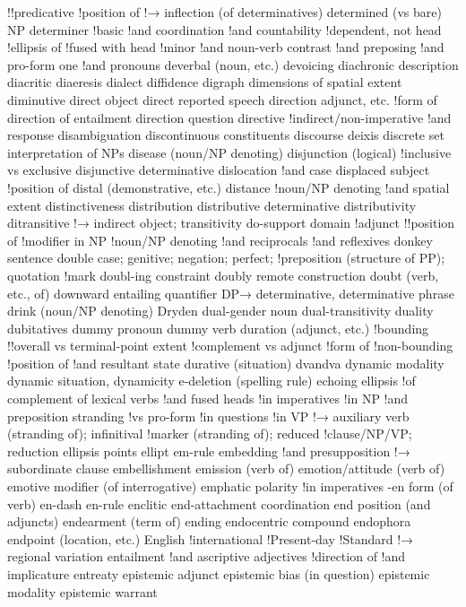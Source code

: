 !!predicative
!position of
!→ inflection (of determinatives)
determined (vs bare) NP
determiner
!basic
!and coordination
!and countability
!dependent, not head
!ellipsis of
!fused with head
!minor
!and noun-verb contrast
!and preposing
!and pro-form one
!and pronouns
deverbal (noun, etc.)
devoicing
diachronic description
diacritic
diaeresis
dialect
diffidence
digraph
dimensions of spatial extent
diminutive
direct object
direct reported speech
direction adjunct, etc.
!form of
direction of entailment
direction question
directive
!indirect/non-imperative
!and response
disambiguation
discontinuous constituents
discourse deixis
discrete set interpretation of NPs
disease (noun/NP denoting)
disjunction (logical)
!inclusive vs exclusive
disjunctive determinative
dislocation
!and case
displaced subject
!position of
distal (demonstrative, etc.)
distance
!noun/NP denoting
!and spatial extent
distinctiveness
distribution
distributive determinative
distributivity
ditransitive
!→ indirect object; transitivity
do-support
domain
!adjunct
!!position of
!modifier in NP
!noun/NP denoting
!and reciprocals
!and reflexives
donkey sentence
double case; genitive; negation; perfect;
!preposition (structure of PP); quotation
!mark
doubl-ing constraint
doubly remote construction
doubt (verb, etc., of)
downward entailing quantifier
DP→ determinative, determinative phrase
drink (noun/NP denoting)
Dryden
dual-gender noun
dual-transitivity
duality
dubitatives
dummy pronoun
dummy verb
duration (adjunct, etc.)
!bounding
!!overall vs terminal-point extent
!complement vs adjunct
!form of
!non-bounding
!position of
!and resultant state
durative (situation)
dvandva
dynamic modality
dynamic situation, dynamicity
e-deletion (spelling rule)
echoing
ellipsis
!of complement of lexical verbs
!and fused heads
!in imperatives
!in NP
!and preposition stranding
!vs pro-form
!in questions
!in VP
!→ auxiliary verb (stranding of); infinitival
!marker (stranding of); reduced
!clause/NP/VP; reduction
ellipsis points
ellipt
em-rule
embedding
!and presupposition
!→ subordinate clause
embellishment
emission (verb of)
emotion/attitude (verb of)
emotive modifier (of interrogative)
emphatic polarity
!in imperatives
-en form (of verb)
en-dash
en-rule
enclitic
end-attachment coordination
end position (and adjuncts)
endearment (term of)
ending
endocentric compound
endophora
endpoint (location, etc.)
English
!international
!Present-day
!Standard
!→ regional variation
entailment
!and ascriptive adjectives
!direction of
!and implicature
entreaty
epistemic adjunct
epistemic bias (in question)
epistemic modality
epistemic warrant
